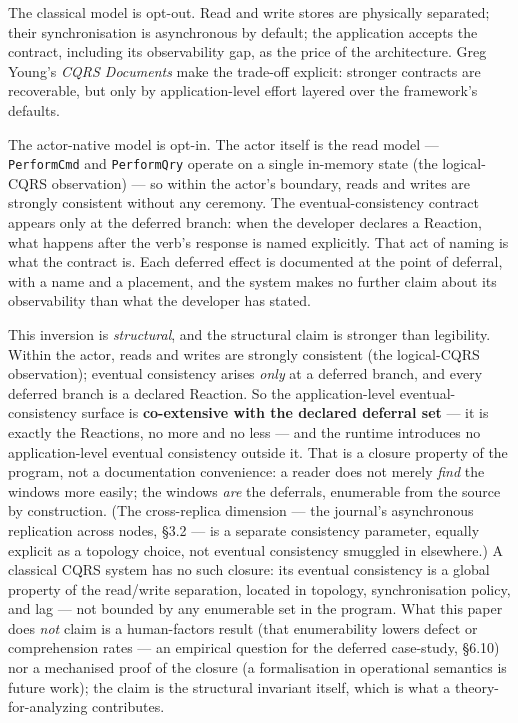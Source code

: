 \documentclass[
]{article}
\let\origtexttt\texttt%
\renewcommand{\texttt}[1]{\origtexttt{\seqsplit{#1}}}%
\let\texttt\origtexttt%
\begin{document}
The classical model is opt-out. Read and write stores are physically
separated; their synchronisation is asynchronous by default; the
application accepts the contract, including its observability gap, as
the price of the architecture. Greg Young's \emph{CQRS Documents} make
the trade-off explicit: stronger contracts are recoverable, but only by
application-level effort layered over the framework's defaults.

The actor-native model is opt-in. The actor itself is the read model ---
\texttt{PerformCmd} and \texttt{PerformQry} operate on a single
in-memory state (the logical-CQRS observation) --- so within the actor's
boundary, reads and writes are strongly consistent without any ceremony.
The eventual-consistency contract appears only at the deferred branch:
when the developer declares a Reaction, what happens after the verb's
response is named explicitly. That act of naming is what the contract
is. Each deferred effect is documented at the point of deferral, with a
name and a placement, and the system makes no further claim about its
observability than what the developer has stated.

This inversion is \emph{structural}, and the structural claim is
stronger than legibility. Within the actor, reads and writes are
strongly consistent (the logical-CQRS observation); eventual consistency
arises \emph{only} at a deferred branch, and every deferred branch is a
declared Reaction. So the application-level eventual-consistency surface
is \textbf{co-extensive with the declared deferral set} --- it is
exactly the Reactions, no more and no less --- and the runtime
introduces no application-level eventual consistency outside it. That is
a closure property of the program, not a documentation convenience: a
reader does not merely \emph{find} the windows more easily; the windows
\emph{are} the deferrals, enumerable from the source by construction.
(The cross-replica dimension --- the journal's asynchronous replication
across nodes, §3.2 --- is a separate consistency parameter, equally
explicit as a topology choice, not eventual consistency smuggled in
elsewhere.) A classical CQRS system has no such closure: its eventual
consistency is a global property of the read/write separation, located
in topology, synchronisation policy, and lag --- not bounded by any
enumerable set in the program. What this paper does \emph{not} claim is
a human-factors result (that enumerability lowers defect or
comprehension rates --- an empirical question for the deferred
case-study, §6.10) nor a mechanised proof of the closure (a
formalisation in operational semantics is future work); the claim is the
structural invariant itself, which is what a theory-for-analyzing
contributes.
\end{document}
